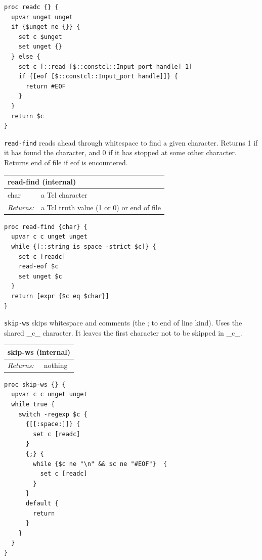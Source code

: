 \documentclass[twoside,9pt]{report}
\begin{document}
\noindent\makebox[\linewidth]{\rule{\linewidth}{0.4pt}}
\begin{lstlisting}
proc readc {} {
  upvar unget unget
  if {$unget ne {}} {
    set c $unget
    set unget {}
  } else {
    set c [::read [$::constcl::Input_port handle] 1]
    if {[eof [$::constcl::Input_port handle]]} {
      return #EOF
    }
  }
  return $c
}
\end{lstlisting}
\noindent\makebox[\linewidth]{\rule{\linewidth}{0.4pt}}

\texttt{read-find} reads ahead through whitespace to find a given character. Returns 1 if it has found the character, and 0 if it has stopped at some other character. Returns end of file if eof is encountered.

\begin{tabular}{ |l l| }
\hline
\multicolumn{2}{|l|}{read-find (internal)} \\
\hline
char & a Tcl character \\
\textit{Returns:} & a Tcl truth value (1 or 0) or end of file \\
\hline
\end{tabular}

\noindent\makebox[\linewidth]{\rule{\linewidth}{0.4pt}}
\begin{lstlisting}
proc read-find {char} {
  upvar c c unget unget
  while {[::string is space -strict $c]} {
    set c [readc]
    read-eof $c
    set unget $c
  }
  return [expr {$c eq $char}]
}
\end{lstlisting}
\noindent\makebox[\linewidth]{\rule{\linewidth}{0.4pt}}

\texttt{skip-ws} skips whitespace and comments (the ; to end of line kind). Uses the shared \_c\_ character. It leaves the first character not to be skipped in \_c\_.

\begin{tabular}{ |l l| }
\hline
\multicolumn{2}{|l|}{skip-ws (internal)} \\
\hline
\textit{Returns:} & nothing \\
\hline
\end{tabular}

\noindent\makebox[\linewidth]{\rule{\linewidth}{0.4pt}}
\begin{lstlisting}
proc skip-ws {} {
  upvar c c unget unget
  while true {
    switch -regexp $c {
      {[[:space:]]} {
        set c [readc]
      }
      {;} {
        while {$c ne "\n" && $c ne "#EOF"}  {
          set c [readc]
        }
      }
      default {
        return
      }
    }
  }
}
\end{lstlisting}
\noindent\makebox[\linewidth]{\rule{\linewidth}{0.4pt}}
\end{document}
